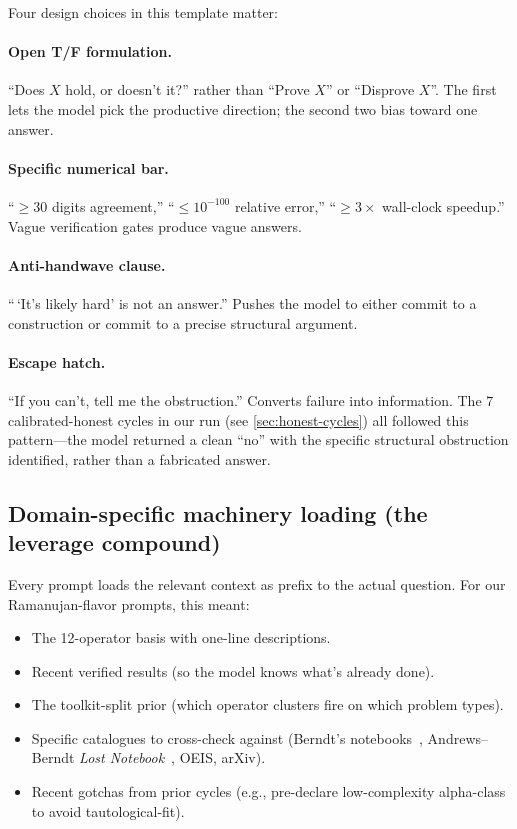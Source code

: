 \documentclass[11pt,reqno]{amsart}
\theoremstyle{definition}
\begin{document}
Four design choices in this template matter:

\paragraph{Open T/F formulation.} ``Does $X$ hold, or doesn't it?''
rather than ``Prove $X$'' or ``Disprove $X$''. The first lets the
model pick the productive direction; the second two bias toward one
answer.

\paragraph{Specific numerical bar.} ``$\ge 30$ digits agreement,''
``$\le 10^{-100}$ relative error,'' ``$\ge 3\times$ wall-clock
speedup.'' Vague verification gates produce vague answers.

\paragraph{Anti-handwave clause.} ``\,`It's likely hard' is not an
answer.'' Pushes the model to either commit to a construction or
commit to a precise structural argument.

\paragraph{Escape hatch.} ``If you can't, tell me the obstruction.''
Converts failure into information. The $7$ calibrated-honest cycles
in our run (see \cref{sec:honest-cycles}) all followed this
pattern---the model returned a clean ``no'' with the specific
structural obstruction identified, rather than a fabricated answer.

\subsection{Domain-specific machinery loading (the leverage compound)}\label{sec:machinery}

Every prompt loads the relevant context as prefix to the actual
question. For our Ramanujan-flavor prompts, this meant:

\begin{itemize}[leftmargin=2em]
\item The 12-operator basis with one-line descriptions.
\item Recent verified results (so the model knows what's already
done).
\item The toolkit-split prior (which operator clusters fire on which
problem types).
\item Specific catalogues to cross-check against (Berndt's
notebooks~\cite{BerndtNB}, Andrews--Berndt \emph{Lost
Notebook}~\cite{AB2013}, OEIS, arXiv).
\item Recent gotchas from prior cycles (e.g., pre-declare
low-complexity alpha-class to avoid tautological-fit).
\end{itemize}
\end{document}
